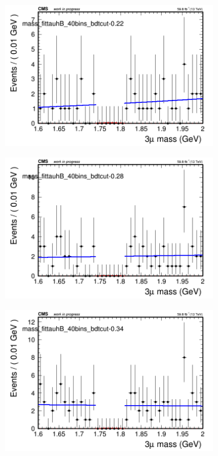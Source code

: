 \begin{figure}[H]
\begin{subfigure}{0.2\textwidth}
        \includegraphics[width=\textwidth]{unfixed_exp/plots/tauhB/massfit_tauhB_40bins_bdtcut-0.22.png}
        \caption{}
    \end{subfigure}
    \begin{subfigure}{0.2\textwidth}
        \includegraphics[width=\textwidth]{unfixed_exp/plots/tauhB/massfit_tauhB_40bins_bdtcut-0.28.png}
        \caption{}
    \end{subfigure}
    \begin{subfigure}{0.2\textwidth}
        \includegraphics[width=\textwidth]{unfixed_exp/plots/tauhB/massfit_tauhB_40bins_bdtcut-0.34.png}

\end{subfigure}
\end{figure}
